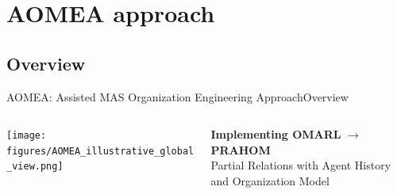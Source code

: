 

\section{AOMEA approach}

\subsection{Overview}

\begin{frame}{AOMEA: Assisted MAS Organization Engineering Approach}{Overview}

    \begin{columns}

        \hspace{-7ex}
        \begin{column}{0.5\textwidth}

            \centering
            \vspace{-23.5ex}
            \texttt{[image: figures/AOMEA\_illustrative\_global\_view.png]}

        \end{column}

        \hspace{-5ex}
        \begin{column}{0.5\textwidth}
            {\small \textbf{Implementing OMARL} $\rightarrow$ \textbf{PRAHOM} \\ { \footnotesize Partial Relations with Agent History and Organization Model}}


\end{column}
\end{columns}
\end{frame}
